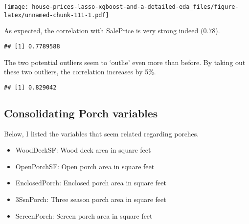 \documentclass[]{article}
\newenvironment{Shaded}{\begin{snugshade}}{\end{snugshade}}
\newcommand{\KeywordTok}[1]{\textcolor[rgb]{0.13,0.29,0.53}{\textbf{#1}}}
\newcommand{\DataTypeTok}[1]{\textcolor[rgb]{0.13,0.29,0.53}{#1}}
\newcommand{\DecValTok}[1]{\textcolor[rgb]{0.00,0.00,0.81}{#1}}
\newcommand{\StringTok}[1]{\textcolor[rgb]{0.31,0.60,0.02}{#1}}
\newcommand{\OperatorTok}[1]{\textcolor[rgb]{0.81,0.36,0.00}{\textbf{#1}}}
\newcommand{\NormalTok}[1]{#1}
\begin{document}
\texttt{[image: house-prices-lasso-xgboost-and-a-detailed-eda\_files/figure-latex/unnamed-chunk-111-1.pdf]}

As expected, the correlation with SalePrice is very strong indeed
(0.78).

\begin{Shaded}
\end{Shaded}

\begin{verbatim}
## [1] 0.7789588
\end{verbatim}

The two potential outliers seem to `outlie' even more than before. By
taking out these two outliers, the correlation increases by 5\%.

\begin{Shaded}
\end{Shaded}

\begin{verbatim}
## [1] 0.829042
\end{verbatim}

\subsection{Consolidating Porch
variables}\label{consolidating-porch-variables}

Below, I listed the variables that seem related regarding porches.

\begin{itemize}
\item
  WoodDeckSF: Wood deck area in square feet
\item
  OpenPorchSF: Open porch area in square feet
\item
  EnclosedPorch: Enclosed porch area in square feet
\item
  3SsnPorch: Three season porch area in square feet
\item
  ScreenPorch: Screen porch area in square feet
\end{itemize}
\end{document}
